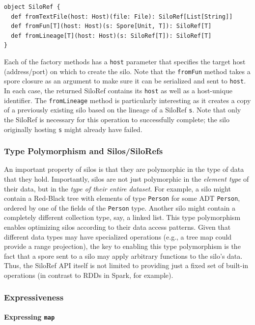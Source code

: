 \documentclass{jfp1}
\begin{document}
\begin{lstlisting}
object SiloRef {
  def fromTextFile(host: Host)(file: File): SiloRef[List[String]]
  def fromFun[T](host: Host)(s: Spore[Unit, T]): SiloRef[T]
  def fromLineage[T](host: Host)(s: SiloRef[T]): SiloRef[T]
}
\end{lstlisting}
\noindent
Each of the factory methods has a \verb|host| parameter that specifies the
target host (address/port) on which to create the silo. Note that the
\verb|fromFun| method takes a spore closure as an argument to make sure it can
be serialized and sent to \verb|host|. In each case, the returned SiloRef
contains its \verb|host| as well as a host-unique identifier. The
\verb|fromLineage| method is particularly interesting as it creates a copy of a
previously existing silo based on the lineage of a SiloRef \verb|s|. Note that
only the SiloRef is necessary for this operation to successfully complete; the
silo originally hosting \verb|s| might already have failed.

\subsubsection{Type Polymorphism and Silos/SiloRefs}

An important property of silos is that they are polymorphic in the type of data
that they hold. Importantly, silos are not just polymorphic in the {\em element
type} of their data, but in the {\em type of their entire dataset}. For example,
a silo might contain a Red-Black tree with elements of type \verb|Person| for
some ADT \verb|Person|, ordered by one of the fields of the \verb|Person| type.
Another silo might contain a completely different collection type, say, a linked
list. This type polymorphism enables optimizing silos according to their data
access patterns. Given that different data types may have specialized operations
(e.g., a tree map could provide a range projection), the key to enabling this
type polymorphism is the fact that a spore sent to a silo may apply arbitrary
functions to the silo's data. Thus, the SiloRef API itself is not limited to
providing just a fixed set of built-in operations (in contrast to RDDs in Spark,
for example).

\subsubsection{Expressiveness}
\label{sec:expr}

\paragraph{Expressing \texttt{map}}
\end{document}
